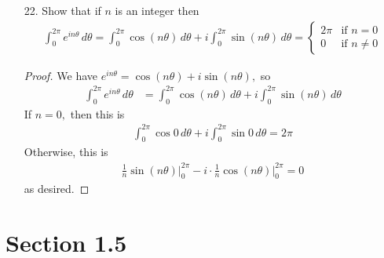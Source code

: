 \documentclass{article}
\begin{document}
\begin{itemize}
	\item[22.] Show that if $n$ is an integer then
		\begin{align*}
			\int_0^{2\pi} e^{in\theta}\, d\theta = \int_0^{2\pi}\cos(n\theta)\, d\theta + i\int_0^{2\pi}\sin(n\theta)\, d\theta = \begin{cases}
				2\pi & \text{if }n=0 \\
				0 &\text{if }n\neq 0
			\end{cases}
		\end{align*}
		\begin{proof}
			We have $e^{in\theta}=\cos (n\theta) + i\sin(n\theta),$ so
			\begin{align*}
				\int_0^{2\pi} e^{in\theta}\, d\theta &= \int_0^{2\pi} \cos(n\theta)\, d\theta + i\int_0^{2\pi} \sin(n\theta)\, d\theta
			\end{align*}
			If $n=0,$ then this is
			\begin{align*}
				\int_0^{2\pi} \cos 0\, d\theta + i\int_0^{2\pi}\sin 0\, d\theta = 2\pi
			\end{align*}
			Otherwise, this is
			\begin{align*}
				\frac{1}{n}\sin(n\theta)\bigg\vert_0^{2\pi} - i\cdot \frac{1}{n}\cos(n\theta)\bigg\vert_0^{2\pi} = 0
			\end{align*}
			as desired.
		\end{proof}
		
\end{itemize}

\section*{Section 1.5}
\end{document}
